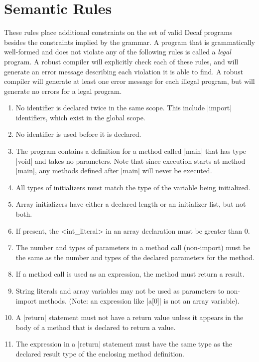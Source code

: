 \documentclass[11pt]{article}
\begin{document}
\section{Semantic Rules}
\label{sec:semantic-rules}

These rules place additional constraints on the set of valid Decaf programs besides the constraints implied by the grammar.
A program that is grammatically well-formed and does not violate any of the following rules is called a \textit{legal} program.
A robust compiler will explicitly check each of these rules, and will generate an error message describing each violation it is able to find.
A robust compiler will generate at least one error message for each illegal program, but will generate no errors for a legal program.

\begin{enumerate}
\item No identifier is declared twice in the same scope.
  This include \decaf|import| identifiers, which exist in the global scope.
\item No identifier is used before it is declared.
\item The program contains a definition for a method called \decaf|main| that has type \decaf|void| and takes no parameters.
  Note that since execution starts at method \decaf|main|, any methods defined after \decaf|main| will never be executed.
\item All types of initializers must match the type of the variable being initialized.
\item Array initializers have either a declared length or an initializer list, but not both.
\item If present, the {\bnf <int_literal>} in an array declaration must be greater than 0.
\item The number and types of parameters in a method call (non-import) must be the same as the number and types of the declared parameters for the method.
\item If a method call is used as an expression, the method must return a result.
\item String literals and array variables may not be used as parameters to non-import methods.
  (Note: an expression like \decaf|a[0]| is not an array variable).
\item A \decaf|return| statement must not have a return value unless it appears in the body of a method that is declared to return a value.
\item The expression in a \decaf|return| statement must have the same type as the declared result type of the enclosing method definition.

\end{enumerate}
\end{document}

